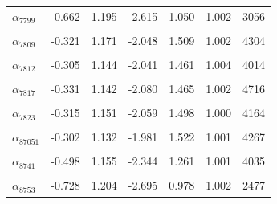 \begin{longtable}{lrrrrrr}
$\alpha_{7799}$ & -0.662 & 1.195 & -2.615 & 1.050 & 1.002 & 3056\\
\cellcolor{gray!10}{$\alpha_{7800}$} & \cellcolor{gray!10}{-0.525} & \cellcolor{gray!10}{1.136} & \cellcolor{gray!10}{-2.325} & \cellcolor{gray!10}{1.174} & \cellcolor{gray!10}{1.001} & \cellcolor{gray!10}{3844}\\
$\alpha_{7809}$ & -0.321 & 1.171 & -2.048 & 1.509 & 1.002 & 4304\\
\cellcolor{gray!10}{$\alpha_{7811}$} & \cellcolor{gray!10}{-0.263} & \cellcolor{gray!10}{1.174} & \cellcolor{gray!10}{-1.968} & \cellcolor{gray!10}{1.612} & \cellcolor{gray!10}{1.001} & \cellcolor{gray!10}{3885}\\
$\alpha_{7812}$ & -0.305 & 1.144 & -2.041 & 1.461 & 1.004 & 4014\\
\cellcolor{gray!10}{$\alpha_{7814}$} & \cellcolor{gray!10}{-0.306} & \cellcolor{gray!10}{1.177} & \cellcolor{gray!10}{-2.082} & \cellcolor{gray!10}{1.591} & \cellcolor{gray!10}{1.001} & \cellcolor{gray!10}{4256}\\
$\alpha_{7817}$ & -0.331 & 1.142 & -2.080 & 1.465 & 1.002 & 4716\\
\cellcolor{gray!10}{$\alpha_{7819}$} & \cellcolor{gray!10}{-0.136} & \cellcolor{gray!10}{1.182} & \cellcolor{gray!10}{-1.796} & \cellcolor{gray!10}{1.827} & \cellcolor{gray!10}{1.001} & \cellcolor{gray!10}{2918}\\
$\alpha_{7823}$ & -0.315 & 1.151 & -2.059 & 1.498 & 1.000 & 4164\\
\cellcolor{gray!10}{$\alpha_{8693}$} & \cellcolor{gray!10}{-0.361} & \cellcolor{gray!10}{1.157} & \cellcolor{gray!10}{-2.121} & \cellcolor{gray!10}{1.434} & \cellcolor{gray!10}{1.004} & \cellcolor{gray!10}{4107}\\
$\alpha_{87051}$ & -0.302 & 1.132 & -1.981 & 1.522 & 1.001 & 4267\\
\cellcolor{gray!10}{$\alpha_{8705}$} & \cellcolor{gray!10}{-0.181} & \cellcolor{gray!10}{1.166} & \cellcolor{gray!10}{-1.871} & \cellcolor{gray!10}{1.729} & \cellcolor{gray!10}{1.000} & \cellcolor{gray!10}{3244}\\
$\alpha_{8741}$ & -0.498 & 1.155 & -2.344 & 1.261 & 1.001 & 4035\\
\cellcolor{gray!10}{$\alpha_{8747}$} & \cellcolor{gray!10}{-0.166} & \cellcolor{gray!10}{1.131} & \cellcolor{gray!10}{-1.836} & \cellcolor{gray!10}{1.692} & \cellcolor{gray!10}{1.001} & \cellcolor{gray!10}{3074}\\
$\alpha_{8753}$ & -0.728 & 1.204 & -2.695 & 0.978 & 1.002 & 2477\\

\end{longtable}
